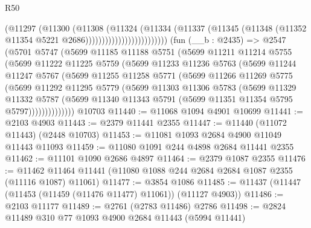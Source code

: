 \begin{lexlean}{R50}
\begin{coremodule}
                                    (@11297
                                      (@11300
                                        (@11308
                                          (@11324
                                            (@11334
                                              (@11337
                                                (@11345
                                                  (@11348
                                                    (@11352
                                                      @11354
                                                      @5221
                                                      @2686)))))))))))))))))))))))))
    (fun (__b : @2435) =>
    @2547
      (@5701
        @5747
        (@5699
          @11185
          @11188
          @5751
          (@5699
            @11211
            @11214
            @5755
            (@5699
              @11222
              @11225
              @5759
              (@5699
                @11233
                @11236
                @5763
                (@5699
                  @11244
                  @11247
                  @5767
                  (@5699
                    @11255
                    @11258
                    @5771
                    (@5699
                      @11266
                      @11269
                      @5775
                      (@5699
                        @11292
                        @11295
                        @5779
                        (@5699
                          @11303
                          @11306
                          @5783
                          (@5699
                            @11329
                            @11332
                            @5787
                            (@5699
                              @11340
                              @11343
                              @5791
                              (@5699 @11351 @11354 @5795 @5797))))))))))))))
    @10703
@11440 := @11068 @1094 @4901 @10699
@11441 := @2103 @4903
@11443 := @2379 @11441 @2355
@11447 := @11440 (@11072 @11443) (@2448 @10703)
@11453 := @11081 @1093 @2684 @4900 @11049 @11443 @11093
@11459 := @11080 @1091 @244 @4898 @2684 @11441 @2355
@11462 := @11101 @1090 @2686 @4897
@11464 := @2379 @1087 @2355
@11476 := @11462 @11464 @11441 (@11080 @1088 @244 @2684 @2684 @1087 @2355 (@11116 @1087) @11061)
@11477 := @3854 @1086
@11485 := @11437 (@11447 (@11453 (@11459 (@11476 @11477) @11061)) (@11127 @4903))
@11486 := @2103 @11177
@11489 := @2761 (@2783 @11486) @2786
@11498 := @2824 @11489 @310 @77 @1093 @4900 @2684 @11443 (@5994 @11441)

\end{coremodule}
\end{lexlean}
